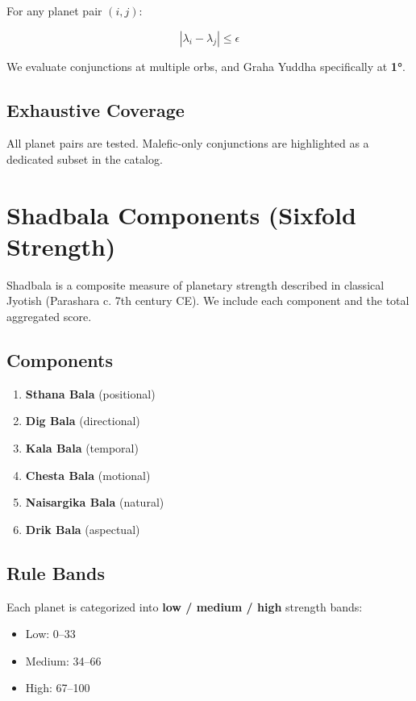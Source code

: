 \documentclass[
  11pt,
  a4paper,
  oneside,
  openany]{report}
\providecommand{\tightlist}{%
  \setlength{\itemsep}{0pt}\setlength{\parskip}{0pt}}\usepackage{longtable,booktabs,array}
\begin{document}
For any planet pair \((i,j)\):

\[
|\lambda_i - \lambda_j| \leq \epsilon
\]

We evaluate conjunctions at multiple orbs, and Graha Yuddha specifically
at \textbf{1°}.

\section{Exhaustive Coverage}\label{exhaustive-coverage-1}

All planet pairs are tested. Malefic-only conjunctions are highlighted
as a dedicated subset in the catalog.

\chapter{Shadbala Components (Sixfold
Strength)}\label{shadbala-components-sixfold-strength}

Shadbala is a composite measure of planetary strength described in
classical Jyotish (Parashara c. 7th century CE). We include each
component and the total aggregated score.

\section{Components}\label{components}

\begin{enumerate}
\def\labelenumi{\arabic{enumi}.}
\tightlist
\item
  \textbf{Sthana Bala} (positional)
\item
  \textbf{Dig Bala} (directional)
\item
  \textbf{Kala Bala} (temporal)
\item
  \textbf{Chesta Bala} (motional)
\item
  \textbf{Naisargika Bala} (natural)
\item
  \textbf{Drik Bala} (aspectual)
\end{enumerate}

\section{Rule Bands}\label{rule-bands}

Each planet is categorized into \textbf{low / medium / high} strength
bands:

\begin{itemize}
\tightlist
\item
  Low: 0--33
\item
  Medium: 34--66
\item
  High: 67--100
\end{itemize}
\end{document}
